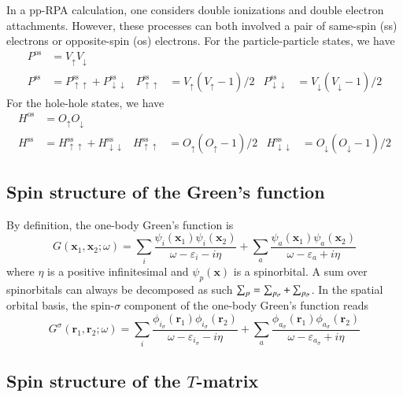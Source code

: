 \documentclass[aip,jcp,reprint,noshowkeys,superscriptaddress]{revtex4-1}
\newcommand{\br}{\mathbf{r}}
\newcommand{\bx}{\mathbf{x}}
\newcommand{\e}[1]{\eps_{#1}}
\newcommand{\MO}[1]{\phi_{#1}}
\newcommand{\SO}[1]{\psi_{#1}}
\newcommand{\eps}{\varepsilon}
\newcommand{\sig}{\sigma}
\newcommand{\bsig}{{\Bar{\sigma}}}
\newcommand{\up}{\uparrow}
\newcommand{\dw}{\downarrow}
\newcommand{\ssp}{\text{ss}}
\newcommand{\osp}{\text{os}}
\begin{document}
In a pp-RPA calculation, one considers double ionizations and double electron attachments.
However, these processes can both involved a pair of same-spin (ss) electrons or opposite-spin (os) electrons.
For the particle-particle states, we have
\begin{align}
	P^{\osp} & = V_\up V_\dw
	\\
	P^{\ssp} & = P_{\up\up}^{\ssp} + P_{\dw\dw}^{\ssp}
	&
	P_{\up\up}^{\ssp} & = V_\up(V_\up - 1)/2
	&
	P_{\dw\dw}^{\ssp} & = V_\dw(V_\dw - 1)/2
\end{align}
For the hole-hole states, we have
\begin{align}
	H^{\osp} & = O_\up O_\dw
	\\
	H^{\ssp} & = H_{\up\up}^{\ssp} + H_{\dw\dw}^{\ssp}
	&
	H_{\up\up}^{\ssp} & = O_\up(O_\up - 1)/2
	&
	H_{\dw\dw}^{\ssp} & = O_\dw(O_\dw - 1)/2
\end{align}

\subsection{Spin structure of the Green's function}

By definition, the one-body Green's function is
\begin{equation}
\label{eq:G}
	G(\bx_1,\bx_2;\omega) 
	= \sum_i \frac{\SO{i}(\bx_1) \SO{i}(\bx_2)}{\omega - \e{i}{} - i\eta}	
	+ \sum_a \frac{\SO{a}(\bx_1) \SO{a}(\bx_2)}{\omega - \e{a}{} + i\eta}	
\end{equation}
where $\eta$ is a positive infinitesimal and $\SO{p}(\bx)$ is a spinorbital.
A sum over spinorbitals can always be decomposed as such $\sum_p = \sum_{p_\sig} + \sum_{p_\bsig}$.
In the spatial orbital basis, the spin-$\sig$ component of the one-body Green's function reads \cite{ReiningBook,Bruneval_2016}
\begin{equation}
\label{eq:G_sig}
	G^{\sig}(\br_1,\br_2;\omega) 
	= \sum_{i} \frac{\MO{i_\sig}(\br_1) \MO{i_\sig}(\br_2)}{\omega - \e{i_\sig}{} - i\eta}	
	+ \sum_{a} \frac{\MO{a_\sig}(\br_1) \MO{a_\sig}(\br_2)}{\omega - \e{a_\sig}{} + i\eta}	
\end{equation}

\subsection{Spin structure of the $T$-matrix}
\end{document}
